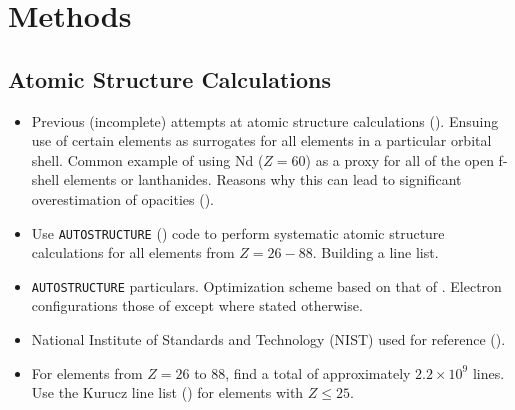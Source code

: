 \documentclass[twocolumn]{aastex63}
\begin{document}
\section{Methods}\label{sec:methods}

\subsection{Atomic Structure Calculations}\label{ssc:atomic}
\begin{itemize}

    \item Previous (incomplete) attempts at atomic structure calculations (\citealt{kasen13, tanaka18}). Ensuing use of certain elements as surrogates for all elements in a particular orbital shell. Common example of using Nd ($Z=60$) as a proxy for all of the open f-shell elements or lanthanides. Reasons why this can lead to significant overestimation of opacities (\citealt{even19}). 

    \item Use \texttt{AUTOSTRUCTURE} (\citealt{badnell16}) code to perform systematic atomic structure calculations for all elements from $Z=26-88$. Building a line list.
    
    \item \texttt{AUTOSTRUCTURE} particulars. Optimization scheme based on that of \cite{kasen13}. Electron configurations those of \cite{tanaka20} except where stated otherwise.
    
    \item National Institute of Standards and Technology (NIST) used for reference (\citealt{kramida19}).
    
    \item For elements from $Z=26$ to $88$, find a total of approximately $2.2\times10^9$ lines. Use the Kurucz line list (\citealt{kurucz95}) for elements with $Z\leqslant25$.
    
\end{itemize}
\end{document}

